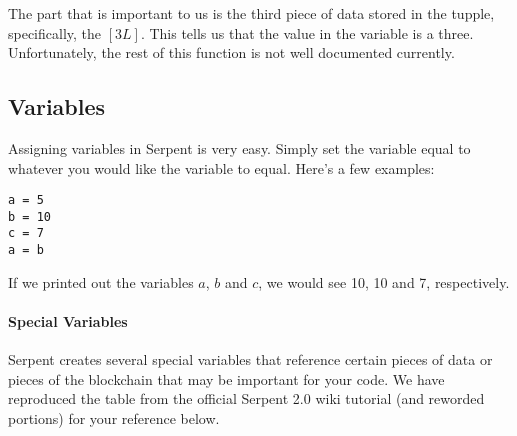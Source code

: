 \documentclass[12pt]{article}
\begin{document}
The part that is important to us is the third piece of data stored in the tupple, specifically, the $[3L]$. This tells us that the value in the variable is a three. Unfortunately, the rest of this function is not well documented currently.


\subsection{Variables}

Assigning variables in Serpent is very easy. Simply set the variable equal to whatever you would like the variable to equal. Here's a few examples:

\begin{lstlisting}
a = 5
b = 10
c = 7
a = b
\end{lstlisting}

If we printed out the variables $a$, $b$ and $c$, we would see 10, 10 and 7, respectively. 

\paragraph{Special Variables}

Serpent creates several special variables that reference certain pieces of data or pieces of the blockchain that may be important for your code. We have reproduced the table from the official Serpent 2.0 wiki tutorial (and reworded portions) for your reference below. \cite{Serpent}
\end{document}
